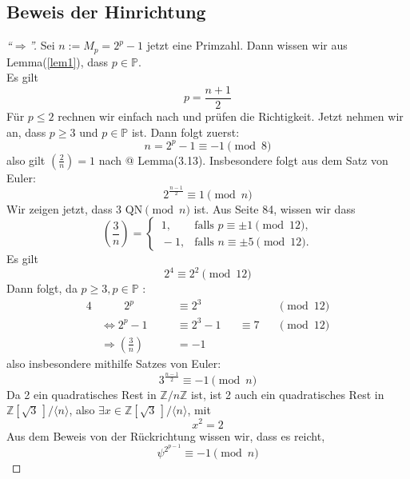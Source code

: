 \documentclass{article}
\makeatletter
\newcommand{\Prime}{\ensuremath{\mathbb{P}}}
\newcommand{\Integer}{\ensuremath{\mathbb{Z}}}
\newcommand{\Zmodn}{\ensuremath{\Integer/n\Integer}}
\newcommand{\ZadThreeModn}{\ensuremath{\Integer[\sqrt{3}\,]/\langle n \rangle}}
\newcommand{\Rmnum}[1]{\expandafter\@slowromancap\romannumeral #1@}
\makeatother
\begin{document}
\subsection{Beweis der Hinrichtung}
\begin{proof}[``$\Rightarrow$'']
Sei $n := M_p = 2^{p} - 1$ jetzt eine Primzahl. Dann wissen wir aus Lemma(\ref{lem1}), dass $p \in \Prime.$ \\Es gilt
\begin{equation}\label{nPequ}
 p = \frac{n + 1}{2}
\end{equation}
F\"{u}r $p \leq 2$ rechnen wir einfach nach und pr\"{u}fen die Richtigkeit. Jetzt nehmen wir an, dass $p \geq 3 $ und $ p \in \Prime$ ist. Dann folgt zuerst:
\[
	n = 2^p - 1 \equiv{-1} \pmod{8}
\]
also gilt $(\frac{2}{n}) = 1$ nach \cite{script} \Rmnum{2} Lemma(3.13). Insbesondere
folgt aus dem Satz von Euler:
\begin{equation}\label{twoPo}
	2^{\frac{n-1}{2}} \equiv{1} \pmod{n}
\end{equation}
Wir zeigen jetzt, dass 3 $\mbox{QN}\pmod{n}$ ist.
Aus \cite{script} Seite 84, wissen wir dass
\[
	\left(\frac{3}{n} \right) = 
	\begin{cases}
	\,1, &\text{falls $p \equiv{\pm1} \pmod{12}$,}\\
	\,-1, &\text{falls $n \equiv{\pm5} \pmod{12}$.}
	\end{cases}
\]
Es gilt
\[
	2^4 \equiv{2^2} \pmod{12}
\]
Dann folgt, da $p \geq 3, p \in \Prime$ :
\begin{alignat*}{4}
	&\phantom{\Rightarrow a} 2^{p}     		&&\equiv{2^3}      &&		   &&\pmod{12}\\
	&\Leftrightarrow 2^{p} - 1 	\quad 		&&\equiv{2^3 - 1}  &&\equiv{7} &&\pmod{12}\\
	&\Rightarrow \left( \frac{3}{n} \right) &&= -1			   &&			   &
\end{alignat*}
also insbesondere mithilfe Satzes von Euler:
\begin{equation}\label{threePot}
	3^{\frac{n-1}{2}} \equiv{-1} \pmod{n}
\end{equation}
Da 2 ein quadratisches Rest in $\Zmodn$ ist, ist 2 auch ein quadratisches Rest in
$\ZadThreeModn$, also $\exists x \in \ZadThreeModn$, mit 
\begin{equation}\label{xQuTwo}
	x^2 = 2
\end{equation}
Aus dem Beweis von der R\"{u}ckrichtung wissen wir, dass es reicht,
\begin{equation}\label{*}
	\psi^{2^{p-1}} \equiv{-1} \pmod{n} \tag{*}
\end{equation}

\end{proof}
\end{document}
